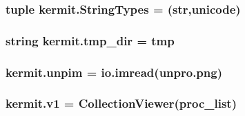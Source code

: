 \subsubsection[{\texorpdfstring{String\+Types}{StringTypes}}]{\setlength{\rightskip}{0pt plus 5cm}tuple kermit.\+String\+Types = (str,unicode)}\hypertarget{namespacekermit_aa7fd97127ffdc923b5f393978698c4e2}{}\label{namespacekermit_aa7fd97127ffdc923b5f393978698c4e2}
\subsubsection[{\texorpdfstring{tmp\+\_\+dir}{tmp_dir}}]{\setlength{\rightskip}{0pt plus 5cm}string kermit.\+tmp\+\_\+dir = \textquotesingle{}tmp\textquotesingle{}}\hypertarget{namespacekermit_aecc2d1d7664b16df7d95dcb97870f517}{}\label{namespacekermit_aecc2d1d7664b16df7d95dcb97870f517}
\subsubsection[{\texorpdfstring{unpim}{unpim}}]{\setlength{\rightskip}{0pt plus 5cm}kermit.\+unpim = io.\+imread(\textquotesingle{}unpro.\+png\textquotesingle{})}\hypertarget{namespacekermit_a9fb3ba81b634d3ff357261211ff1c453}{}\label{namespacekermit_a9fb3ba81b634d3ff357261211ff1c453}
\subsubsection[{\texorpdfstring{v1}{v1}}]{\setlength{\rightskip}{0pt plus 5cm}kermit.\+v1 = Collection\+Viewer({\bf proc\+\_\+list})}\hypertarget{namespacekermit_afc1e6acdf61366d1c0f44edbc11ff790}{}\label{namespacekermit_afc1e6acdf61366d1c0f44edbc11ff790}
